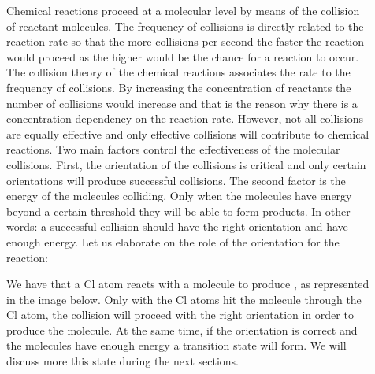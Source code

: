 \documentclass[main.tex]{subfiles}
\begin{document}
\begin{description}
\item[] 
Chemical reactions proceed at a molecular level by means of the collision of reactant molecules. The frequency of collisions is directly related to the reaction rate so that the more collisions per second the faster the reaction would proceed as the higher would be the chance for a reaction to occur. The collision theory of the chemical reactions associates the rate to the frequency of collisions. By increasing the concentration of reactants the number of collisions would increase and that is the reason why there is a concentration dependency on the reaction rate. However, not all collisions are equally effective and only effective collisions will contribute to chemical reactions. Two main factors control the effectiveness of the molecular collisions. First, the orientation of the collisions is critical and only certain orientations will produce successful collisions. The second factor is the energy of the molecules colliding. Only when the molecules have energy beyond a certain threshold they will be able to form products. In other words: a successful collision should have the right orientation and have enough energy. Let us elaborate on the role of the orientation for the reaction:
\begin{center}\end{center}
We have that a Cl atom reacts with a  molecule to produce , as represented in the image below. Only with the Cl atoms hit the  molecule through the Cl atom, the collision will proceed with the right orientation in order to produce the  molecule. At the same time, if the orientation is correct and the molecules have enough energy a transition state will form. We will discuss more this state during the next sections. 



 


\end{description}
\end{document}

